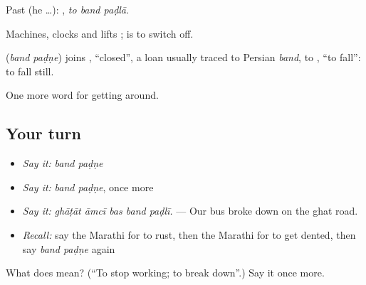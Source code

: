 Past (he …):   , \emph{to band paḍlā}.

Machines, clocks and lifts  ;   is to switch off.

\begin{cousinweb}
\textbf{ } (\emph{band paḍṇe}) joins \textbf{}, \textquotedblleft{}closed\textquotedblright{}, a loan usually traced to Persian \emph{band}, to \textbf{}, \textquotedblleft{}to fall\textquotedblright{}: to fall still.
\end{cousinweb}

\begin{grammarlens}[title={What you've built}]
One more word for getting around.
\end{grammarlens}

\subsection*{Your turn}
\begin{itemize}
\raggedright
  \item \emph{Say it:} \emph{band paḍṇe}
  \item \emph{Say it:} \emph{band paḍṇe}, once more
  \item \emph{Say it:} \emph{ghāṭāt āmcī bas band paḍlī.} — Our bus broke down on the ghat road.
  \item \emph{Recall:} say the Marathi for to rust, then the Marathi for to get dented, then say \emph{band paḍṇe} again
\end{itemize}

\begin{tcolorbox}[breakable,colback=teal!4,colframe=teal!35!black,title={Before you move on}]
What does   mean? (\textquotedblleft{}To stop working; to break down\textquotedblright{}.) Say it once more.
\end{tcolorbox}
